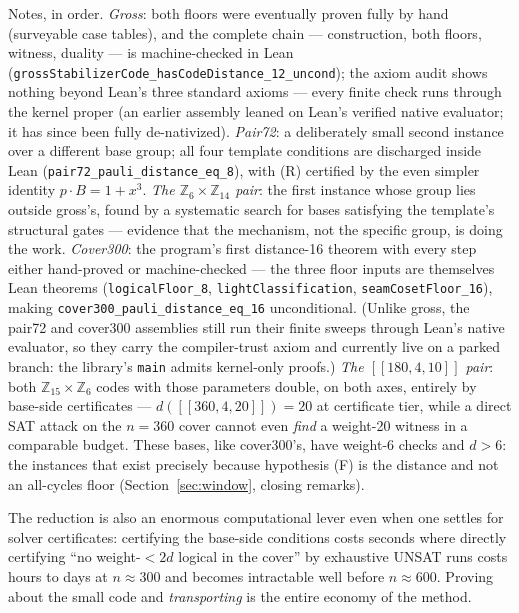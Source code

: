 \documentclass[11pt]{article}
\theoremstyle{plain}
\theoremstyle{definition}
\theoremstyle{remark}
\newcommand{\Z}{\mathbb{Z}}
\begin{document}
Notes, in order. \emph{Gross}: both floors were eventually proven fully by
hand (surveyable case tables), and the complete chain --- construction, both
floors, witness, duality --- is machine-checked in Lean
(\texttt{grossStabilizerCode\_hasCodeDistance\_12\_uncond}); the axiom audit
shows nothing beyond Lean's three standard axioms --- every finite check runs
through the kernel proper (an earlier assembly leaned on Lean's verified
native evaluator; it has since been fully de-nativized).
\emph{Pair72}: a deliberately small second instance over a
different base group; all four template conditions are discharged inside Lean
(\texttt{pair72\_pauli\_distance\_eq\_8}), with (R) certified by the even
simpler identity $p \cdot B = 1 + x^3$. \emph{The $\Z_6{\times}\Z_{14}$
pair}: the first instance whose group lies outside gross's, found by a
systematic search for bases satisfying the template's structural gates ---
evidence that the mechanism, not the specific group, is doing the work.
\emph{Cover300}: the program's first distance-16 theorem with every step
either hand-proved or machine-checked --- the three floor inputs are themselves
Lean theorems (\texttt{logicalFloor\_8}, \texttt{lightClassification},
\texttt{seamCosetFloor\_16}), making
\texttt{cover300\_pauli\_distance\_eq\_16} unconditional. (Unlike gross, the
pair72 and cover300 assemblies still run their finite sweeps through Lean's
native evaluator, so they carry the compiler-trust axiom and currently live
on a parked branch: the library's \texttt{main} admits kernel-only proofs.)
\emph{The $[[180,4,10]]$ pair}: both $\Z_{15}\times\Z_6$ codes with those
parameters double, on both axes, entirely by base-side certificates ---
$d([[360,4,20]]) = 20$ at certificate tier, while a direct SAT attack on the
$n = 360$ cover cannot even \emph{find} a weight-20 witness in a comparable
budget. These bases, like cover300's, have weight-6 checks and $d > 6$: the
instances that exist precisely because hypothesis (F) is the distance and
not an all-cycles floor (Section~\ref{sec:window}, closing remarks).

The reduction is also an enormous computational lever even when one settles
for solver certificates: certifying the base-side conditions costs seconds
where directly certifying ``no weight-$<2d$ logical in the cover'' by
exhaustive UNSAT runs costs hours to days at $n \approx 300$ and becomes
intractable well before $n \approx 600$. Proving about the small code and
\emph{transporting} is the entire economy of the method.

\end{document}
